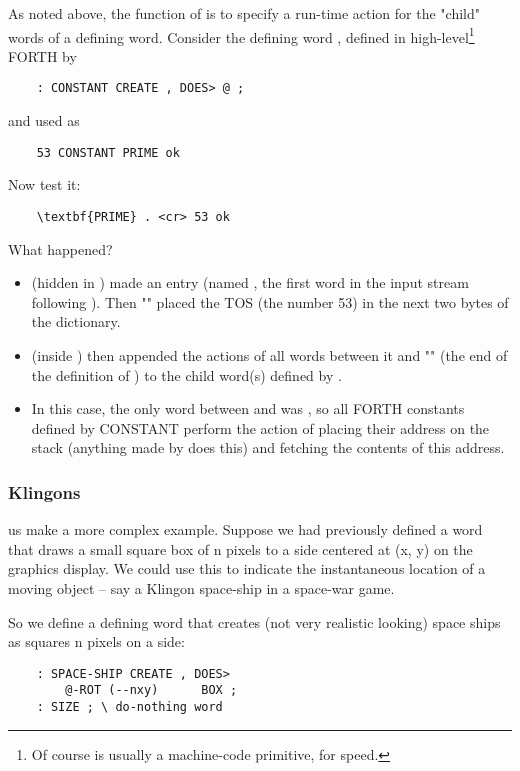 As noted above, the function of  is to specify a run-time action for the "child" words of a defining word. Consider the defining word , defined in high-level\footnote{Of course  is usually a machine-code primitive, for speed.} FORTH by

\begin{lstlisting}
    : CONSTANT CREATE , DOES> @ ;
\end{lstlisting}
and used as
\begin{lstlisting}
    53 CONSTANT PRIME ok
\end{lstlisting}

Now test it:
\begin{lstlisting}
    \textbf{PRIME} . <cr> 53 ok
\end{lstlisting}

What happened?
\begin{itemize}
    \item {} (hidden in ) made an entry (named  , the first word in the input stream following ). Then "\bc{,}" placed the TOS (the number 53) in the next two bytes of the dictionary.
    \item {} (inside ) then appended the actions of all words between it and "\bc{;}" (the end of the definition of ) to the child word(s) defined by .
    \item In this case, the only word between  and \bc{;} was  , so all FORTH constants defined by CONSTANT perform the action of placing their address on the stack (anything made by  does this) and fetching the contents of this address.
\end{itemize}

\subsubsection{Klingons}

 us make a more complex example. Suppose we had previously defined a word  that draws a small square box of n pixels to a side centered at (x, y) on the graphics display. We could use this to indicate the instantaneous location of a moving object -- say a Klingon space-ship in a space-war game.

So we define a defining word that creates (not very realistic looking) space ships as squares n pixels on a side:

\begin{lstlisting}
    : SPACE-SHIP CREATE , DOES>
        @-ROT (--nxy)      BOX ;
    : SIZE ; \ do-nothing word
\end{lstlisting}

